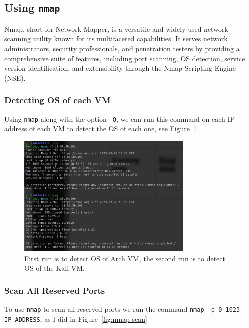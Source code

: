 \documentclass{article}
\def\c#1{\texttt{#1}}
\begin{document}
\subsection{Using \c{nmap}}
Nmap, short for Network Mapper, is a versatile and widely used network scanning utility known for its multifaceted capabilities. It serves network administrators, security professionals, and penetration testers by providing a comprehensive suite of features, including port scanning, OS detection, service version identification, and extensibility through the Nmap Scripting Engine (NSE).

\subsubsection{Detecting OS of each VM}
Using \c{nmap} along with the option \c{-O}, we can run this command on each IP address of each VM
to detect the OS of each one, see Figure~\ref{fig:nmap-os-detect}

\begin{figure}[ht]
	\begin{center}
		\includegraphics[width=0.75\textwidth]{figures/nmap-os-detect.png}
	\end{center}
	\caption{First run is to detect OS of Arch VM, the second run is to detect OS of the Kali VM.}
	\label{fig:nmap-os-detect}
\end{figure}

\subsubsection{Scan All Reserved Ports}
To use \c{nmap} to scan all reserved ports we run the command \c{nmap -p 0-1023 IP\_ADDRESS}, as I did in Figure~\ref{fig:nmap-scan}
\end{document}
